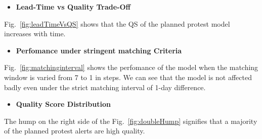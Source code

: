 \begin{itemize}
    \item {\bf Lead-Time vs Quality Trade-Off}
\end{itemize}

Fig.~\ref{fig:leadTimeVsQS} shows that the QS of the planned protest model increases with time. 

\begin{itemize}
    \item {\bf Perfomance under stringent matching Criteria}
\end{itemize}
Fig.~\ref{fig:matchinginterval} shows the perfomance of the model when the matching window is varied from 7 to 1 in steps. We can see that the model is not affected badly even under the strict matching interval of 1-day difference.

\begin{itemize}
    \item {\bf Quality Score Distribution}
\end{itemize}
The hump on the right side of the Fig.~\ref{fig:doubleHump} signifies that a majority of the planned protest alerts are high quality.

